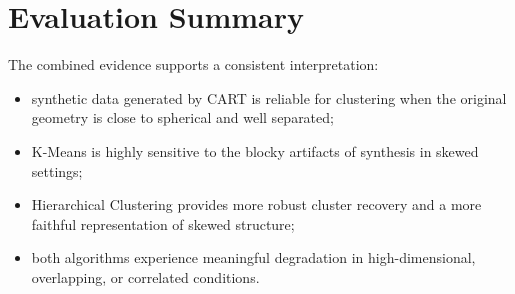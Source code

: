 \section{Evaluation Summary}
\label{sec:evaluation-summary}

The combined evidence supports a consistent interpretation:
\begin{itemize}
  \item synthetic data generated by CART is reliable for clustering when the original geometry is close to spherical and well separated;
  \item K-Means is highly sensitive to the blocky artifacts of synthesis in skewed settings;
  \item Hierarchical Clustering provides more robust cluster recovery and a more faithful representation of skewed structure;
  \item both algorithms experience meaningful degradation in high-dimensional, overlapping, or correlated conditions.
\end{itemize}
